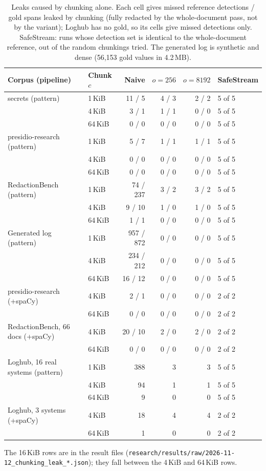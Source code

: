 \documentclass[11pt,a4paper]{article}
\begin{document}
\begin{table}[ht]
\caption{Leaks caused by chunking alone. Each cell gives missed reference detections / gold spans leaked by chunking (fully redacted by the whole-document pass, not by the variant); Loghub has no gold, so its cells give missed detections only. SafeStream: runs whose detection set is identical to the whole-document reference, out of the random chunkings tried. The generated log is synthetic and dense (56,153 gold values in 4.2\,MB).}\label{t:chunk}
\small
\begin{tabular*}{\textwidth}{@{\extracolsep\fill}llrrrl}
\toprule
Corpus (pipeline) & Chunk $c$ & Naive & $o = 256$ & $o = 8192$ & SafeStream \\
\midrule
secrets (pattern) & 1\,KiB & 11 / 5 & 4 / 3 & 2 / 2 & 5 of 5 \\
 & 4\,KiB & 3 / 1 & 1 / 1 & 0 / 0 & 5 of 5 \\
 & 64\,KiB & 0 / 0 & 0 / 0 & 0 / 0 & 5 of 5 \\
presidio-research (pattern) & 1\,KiB & 5 / 7 & 1 / 1 & 1 / 1 & 5 of 5 \\
 & 4\,KiB & 0 / 0 & 0 / 0 & 0 / 0 & 5 of 5 \\
 & 64\,KiB & 0 / 0 & 0 / 0 & 0 / 0 & 5 of 5 \\
RedactionBench (pattern) & 1\,KiB & 74 / 237 & 3 / 2 & 3 / 2 & 5 of 5 \\
 & 4\,KiB & 9 / 10 & 1 / 0 & 1 / 0 & 5 of 5 \\
 & 64\,KiB & 1 / 1 & 0 / 0 & 0 / 0 & 5 of 5 \\
Generated log (pattern) & 1\,KiB & 957 / 872 & 0 / 0 & 0 / 0 & 5 of 5 \\
 & 4\,KiB & 234 / 212 & 0 / 0 & 0 / 0 & 5 of 5 \\
 & 64\,KiB & 16 / 12 & 0 / 0 & 0 / 0 & 5 of 5 \\
presidio-research (+spaCy) & 4\,KiB & 2 / 1 & 0 / 0 & 0 / 0 & 2 of 2 \\
 & 64\,KiB & 0 / 0 & 0 / 0 & 0 / 0 & 2 of 2 \\
RedactionBench, 66 docs (+spaCy) & 4\,KiB & 20 / 10 & 2 / 0 & 2 / 0 & 2 of 2 \\
 & 64\,KiB & 0 / 0 & 0 / 0 & 0 / 0 & 2 of 2 \\
\midrule
Loghub, 16 real systems (pattern) & 1\,KiB & 388 & 3 & 3 & 5 of 5 \\
 & 4\,KiB & 94 & 1 & 1 & 5 of 5 \\
 & 64\,KiB & 9 & 0 & 0 & 5 of 5 \\
Loghub, 3 systems (+spaCy) & 4\,KiB & 18 & 4 & 4 & 2 of 2 \\
 & 64\,KiB & 1 & 0 & 0 & 2 of 2 \\
\bottomrule
\end{tabular*}

\smallskip
\footnotesize The 16\,KiB rows are in the result files (\texttt{research/results/raw/2026-11-12\_chunking\_leak\_*.json}); they fall between the 4\,KiB and 64\,KiB rows.
\end{table}
\end{document}
